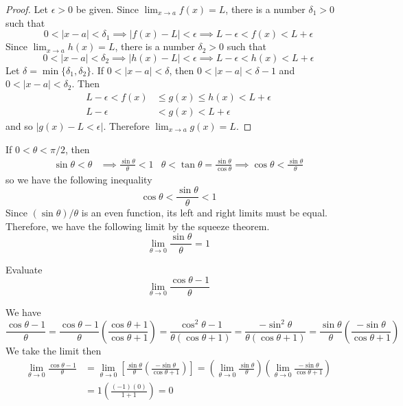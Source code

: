 \begin{proof}
    Let \(\epsilon>0\) be given.
    Since \(\displaystyle{\lim_{x\to a}f(x)=L}\),
    there is a number \(\delta_1>0\) such that
    \[0<|x-a|<\delta_1\implies|f(x)-L|<\epsilon\implies L-\epsilon<f(x)
    <L+\epsilon\]
    Since \(\displaystyle{\lim_{x\to a}h(x)=L}\),
    there is a number \(\delta_2>0\) such that
    \[0<|x-a|<\delta_2\implies|h(x)-L|<\epsilon\implies L-\epsilon<h(x)
    <L+\epsilon\]
    Let \(\delta=\min\{\delta_1,\delta_2\}\).
    If \(0<|x-a|<\delta\), then \(0<|x-a|<\delta-1\) and \(0<|x-a|<\delta_2\).
    Then
    \begin{align*}
        L-\epsilon<f(x) &\leq g(x)\leq h(x)<L+\epsilon \\
        L-\epsilon &< g(x)<L+\epsilon
    \end{align*}
    and so \(|g(x)-L<\epsilon|\).
    Therefore \(\displaystyle{\lim_{x\to a}g(x)=L}\).
\end{proof}

If \(0<\theta<\pi/2\), then
\begin{align*}
    \sin\theta<\theta &\implies \frac{\sin\theta}{\theta}<1
    & \theta<\tan\theta=\frac{\sin\theta}{\cos\theta}\implies\cos\theta
    <\frac{\sin\theta}{\theta}
\end{align*}
so we have the following inequality
\[\cos\theta<\frac{\sin\theta}{\theta}<1\]
Since \((\sin\theta)/\theta\) is an even function, its left and right limits
must be equal.
Therefore, we have the following limit by the squeeze theorem.
\[\lim_{\theta\to 0}\frac{\sin\theta}{\theta}=1\]
\begin{problem}
    Evaluate \[\lim_{\theta\to 0}\frac{\cos\theta-1}{\theta}\]
\end{problem}
\begin{solution}
    We have
    \[\frac{\cos\theta-1}{\theta}
    =\frac{\cos\theta-1}{\theta}\left(\frac{\cos\theta+1}{\cos\theta+1}\right)
    =\frac{\cos^2\theta-1}{\theta(\cos\theta+1)}
    =\frac{-\sin^2\theta}{\theta(\cos\theta+1)}
    =\frac{\sin\theta}{\theta}\left(\frac{-\sin\theta}{\cos\theta+1}\right)\]
    We take the limit then
    \begin{align*}
        \lim_{\theta\to 0}\frac{\cos\theta-1}{\theta}
        &= \lim_{\theta\to 0}\left[\frac{\sin\theta}{\theta}
        \left(\frac{-\sin\theta}{\cos\theta+1}\right)\right]
        =\left(\lim_{\theta\to 0}\frac{\sin\theta}{\theta}\right)
        \left(\lim_{\theta\to 0}\frac{-\sin\theta}{\cos\theta+1}\right) \\
        &= 1\left(\frac{(-1)(0)}{1+1}\right)=0 
    \end{align*}
\end{solution}